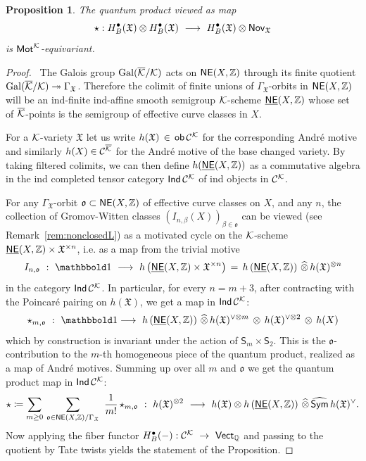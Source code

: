 \documentclass[twoside,leqno]{article}
\numberwithin{equation}{section}
\theoremstyle{plain}
\newtheorem{proposition}[equation]{Proposition}
\theoremstyle{definition}
\begin{document}
\begin{proposition}The quantum product viewed as map
\begin{equation} \label{eq:qupkay}
\star : H^{\bullet}_{B}(\mathfrak{X})\otimes
H^{\bullet}_{B}(\mathfrak{X}) \ \longrightarrow
\ H^{\bullet}_{B}(\mathfrak{X})\otimes \mathsf{Nov}_{\mathfrak{X}}
\end{equation}
is $\mathsf{Mot}^{\mathcal K}$-equivariant.
\end{proposition}
\begin{proof} \ The Galois group $\operatorname{Gal}(\overline{\mathcal K}/\mathcal K)$ acts on
$\mathsf{NE}(X,\mathbb Z)$ through its finite quotient $\operatorname{Gal}(\overline{\mathcal K}/\mathcal K)
\twoheadrightarrow \Gamma_{\mathfrak{X}}$. Therefore the colimit of
finite unions of $\Gamma_{\mathfrak{X}}$-orbits in
$\mathsf{NE}(X,\mathbb Z)$ will be an ind-finite ind-affine smooth semigroup
$\mathcal K$-scheme $\underline{\mathsf{NE}}(X,\mathbb Z)$ whose set of $\overline{\mathcal K}$-points is the
semigroup of effective curve classes in $X$.

For a $\mathcal K$-variety $\mathfrak{X}$ let us write $h(\mathfrak{X}) \,
\in \, \mathsf{ob}\, \mathcal{C}^{\mathcal K}$ for the corresponding Andr\'{e}
motive and similarly $h(X) \in \mathcal{C}^{\overline{\mathcal K}}$ for the Andr\'{e} motive of the base changed variety. By taking filtered colimits, we can then define
$h(\underline{\mathsf{NE}}(X,\mathbb Z))$ as a commutative algebra in the ind completed
tensor category $\mathsf{Ind}\, \mathcal{C}^{\mathcal K}$ of ind objects in
$\mathcal{C}^{\mathcal K}$.

For any $\Gamma_{\mathfrak{X}}$-orbit $\mathfrak{o} \subset
\mathsf{NE}(X,\mathbb Z)$ of effective curve classes on $X$, and any $n$, 
the collection of Gromov-Witten classes
$\left(I_{n,\beta}(X)\right)_{\beta \in \mathfrak{o}}$ can be viewed (see Remark~\ref{rem:nonclosedL}) as
a motivated cycle on the $\mathcal K$-scheme
$\underline{\mathsf{NE}}(X,\mathbb Z)\times \mathfrak{X}^{\times n}$, i.e. as a map from the trivial motive
\[
I_{n,\mathfrak{o}} \ : \ \triv \
\longrightarrow \ h\left(\bbNE(X,\bbZ)\times \mathfrak{X}^{\times n}\right) \, = \,
h\left(\bbNE(X,\bbZ)\right)\, \widehat{\otimes}  \, h(\mathfrak{X})^{\otimes n}
\]
in the category $\mathsf{Ind}\,\mathcal{C}^{\mathcal K}$. In particular, for every
$n = m+3$, after contracting with the
Poincar\'{e} pairing on $h(\mathfrak{X})$, we get
a map in $\mathsf{Ind}\, \mathcal{C}^{\mathcal K}$:
\[
\qup_{m,\mathfrak{o}} \ : \ \triv
\longrightarrow \  h\left(\bbNE(X,\bbZ)\right) \, \widehat{\otimes} \,
h(\mathfrak{X})^{\vee \otimes m} \, \otimes \, h(\mathfrak{X})^{\vee \otimes 2}\, \otimes\,
h(X)
\]
which by construction is invariant under the action of
$\mathsf{S}_{m} \times \mathsf{S}_{2}$. This is the $\mathfrak{o}$-contribution
to the $m$-th homogeneous piece of
the quantum product, realized as a map of Andr\'{e} motives. Summing up
over all $m$ and $\mathfrak{o}$ we get the quantum product map in
$\mathsf{Ind}\, \mathcal{C}^{\mathcal K}$:
  \[
  \qup \coloneqq \sum_{m\geq 0}\, \sum_{\mathfrak{o} \in
    \mathsf{NE}(X,\bbZ)/\Gamma_{\mathfrak{X}}} \ \frac{1}{m!} \,
  \qup_{m,\mathfrak{o}} \ :
  \ h(\mathfrak{X})^{\otimes 2} \ \longrightarrow \ h(\mathfrak{X})\otimes
  h\left(\bbNE(X,\bbZ)\right) \, \widehat{\otimes} \,
  \widehat{\mathsf{Sym}} \, h(\mathfrak{X})^{\vee}. 
  \]
Now applying the fiber functor $H^{\bullet}_{B}(-) : \mathcal{C}^{\mathcal K} \ \to
\ \mathsf{Vect}_{\mathbb Q}$ and passing to the quotient by Tate twists yields
the statement of the Proposition.  
\end{proof}
\end{document}
